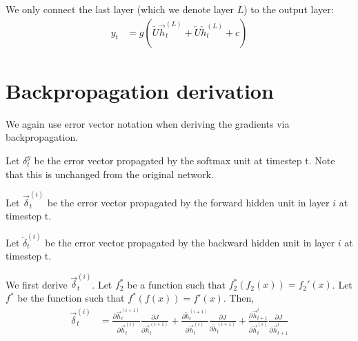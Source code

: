 \documentclass[12pt]{article}
\newcommand{\pdeq}[2]{\frac{\partial #1}{\partial #2}}
\begin{document}
    We only connect the last layer (which we denote layer $L$) to the output layer:
    \begin{align}
      y_t &= g(\underrightarrow{U} \overrightarrow{h}_{t}^{(L)} + \underleftarrow{U} \overleftarrow{h}_{t}^{(L)} + c)
    \end{align}

  \section{Backpropagation derivation}

    We again use error vector notation when deriving the gradients via backpropagation.

    Let $\delta_t^y$ be the error vector propagated by the softmax unit at timestep t. Note that this is unchanged from the original network.

    Let $\overrightarrow{\delta}_t^{(i)}$ be the error vector propagated by the 
    forward hidden unit in layer $i$ at timestep t.

    Let $\overleftarrow{\delta}_t^{(i)}$ be the error vector propagated by the 
    backward hidden unit in layer $i$ at timestep t.

    We first derive $\overrightarrow{\delta}_t^{(i)}$. Let $f_2^*$ be a function such that $f_2^* (f_2 (x)) = f_2 ' (x)$. Let $f^*$ be the function such that $f^* (f(x)) = f'(x)$. Then,
    \begin{align*}
      \overrightarrow{\delta}_t^{(i)} &= \pdeq{\overrightarrow{h}_t^{(i+1)}}{\overrightarrow{h}_t^{(i)}} \pdeq{J}{\overrightarrow{h}_t^{(i+1)}} + \pdeq{\overleftarrow{h}_t^{(i+1)}}{\overrightarrow{h}_t^{(i)}} \pdeq{J}{\overleftarrow{h}_t^{(i+1)}} + \pdeq{\overrightarrow{h}_{t+1}^{i}}{\overrightarrow{h}_t^{(i)}} \pdeq{J}{\overrightarrow{h}_{t+1}^{i}}
    \end{align*} 
\end{document}
